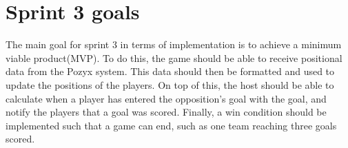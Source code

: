 \section{Sprint 3 goals}
The main goal for sprint 3 in terms of implementation is to achieve a minimum viable product(MVP).
To do this, the game should be able to receive positional data from the Pozyx system.
This data should then be formatted and used to update the positions of the players.
On top of this, the host should be able to calculate when a player has entered the opposition's goal with the goal, and notify the players that a goal was scored.
Finally, a win condition should be implemented such that a game can end, such as one team reaching three goals scored.

